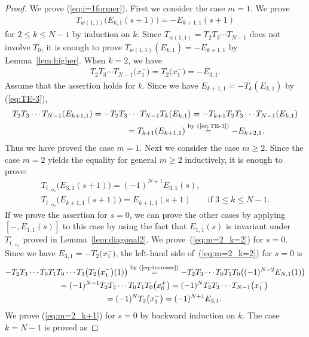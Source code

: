 \documentclass[10pt,a4paper]{amsart}
\theoremstyle{definition}
\numberwithin{equation}{section}
\begin{document}
\begin{proof}
We prove (\ref{eq:i=1former}). First we consider the case $m=1$. We prove
\begin{gather*}
T_{w(1,1)} \big(E_{k,1}(s+1)\big)=-E_{k+1,1}(s+1)
\end{gather*}
for $2 \leq k \leq N-1$ by induction on $k$. Since $T_{w(1,1)}=T_2 T_3 \cdots T_{N-1}$ does not involve $T_0$, it is enough to prove $T_{w(1,1)}(E_{k,1})=-E_{k+1,1}$ by Lemma~\ref{lem:higher}. When $k=2$, we have
\begin{gather*}
T_2 T_3 \cdots T_{N-1}\big(x_1^-\big) = T_2\big(x_1^-\big) = -E_{3,1}.
\end{gather*}
Assume that the assertion holds for $k$. Since we have $E_{k+1,1}=-T_k(E_{k,1})$ by (\ref{eq:TE-3}),
\begin{gather*}
T_2 T_3 \cdots T_{N-1}(E_{k+1,1}) = -T_2 T_3 \cdots T_{N-1} T_k(E_{k,1}) = -T_{k+1} T_2 T_3 \cdots T_{N-1} (E_{k,1})\\
\hphantom{T_2 T_3 \cdots T_{N-1}(E_{k+1,1})}{} = T_{k+1}(E_{k+1,1}) \overset{\text{by (\ref{eq:TE-3})}}{=} -E_{k+2,1}.
\end{gather*}
Thus we have proved the case $m=1$. Next we consider the case $m \geq 2$. Since the case $m=2$ yields the equality for general $m \geq 2$ inductively, it is enough to prove:
\begin{gather}
T_{t_{-\alpha_2}}\big(E_{3,1}(s+1)\big) = (-1)^{N+1}E_{3,1}(s), \label{eq:m=2_k=2}\\
T_{t_{-\alpha_2}}\big(E_{k+1,1}(s+1)\big) = E_{k+1,1}(s+1) \qquad \text{if $3 \leq k \leq N-1$}. \label{eq:m=2_k+1}
\end{gather}
If we prove the assertion for $s=0$, we can prove the other cases by applying $[-,E_{1,1}(s)]$ to this case by using the fact that $E_{1,1}(s)$ is invariant under $T_{t_{-\alpha_2}}$ proved in Lemma~\ref{lem:diagonal2}.
We prove~(\ref{eq:m=2_k=2}) for $s=0$. Since we have $E_{3,1}=-T_2\big(x_1^-\big)$, the left-hand side of~(\ref{eq:m=2_k=2}) for $s=0$ is
\begin{gather*}
-T_2 T_3 \cdots T_0 T_1 T_0 \cdots T_3 \big(T_2 \big(x_1^-\big)(1)\big) \overset{\text{by (\ref{eq:decrease})}}{=} -T_2 T_3 \cdots T_0 T_1 T_0\big( (-1)^{N-2} E_{N,1}(1) \big) \\
\qquad {} = (-1)^{N-1} T_2 T_3 \cdots T_0 T_1 T_0 \big(x_0^+\big) = (-1)^N T_2 T_3 \cdots T_{N-1} \big(x_1^-\big) \\
\qquad{} = (-1)^N T_2\big(x_1^-\big) = (-1)^{N+1} E_{3,1}.
\end{gather*}
We prove (\ref{eq:m=2_k+1}) for $s=0$ by backward induction on $k$. The case $k=N-1$ is proved as

\end{proof}
\end{document}

